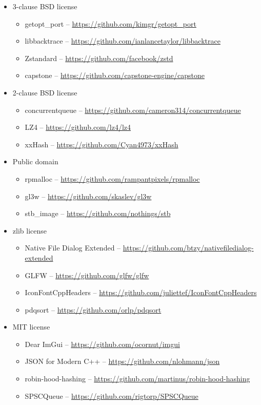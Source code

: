 \documentclass[hidelinks,titlepage,a4paper]{article}
\begin{document}
\begin{itemize}
\item 3-clause BSD license
\begin{itemize}
\item getopt\_port -- \url{https://github.com/kimgr/getopt\_port}
\item libbacktrace \faStar{} -- \url{https://github.com/ianlancetaylor/libbacktrace}
\item Zstandard -- \url{https://github.com/facebook/zstd}
\item capstone -- \url{https://github.com/capstone-engine/capstone}
\end{itemize}

\item 2-clause BSD license
\begin{itemize}
\item concurrentqueue \faStar{} -- \url{https://github.com/cameron314/concurrentqueue}
\item LZ4 \faStar{} -- \url{https://github.com/lz4/lz4}
\item xxHash -- \url{https://github.com/Cyan4973/xxHash}
\end{itemize}

\item Public domain
\begin{itemize}
\item rpmalloc \faStar{} -- \url{https://github.com/rampantpixels/rpmalloc}
\item gl3w -- \url{https://github.com/skaslev/gl3w}
\item stb\_image -- \url{https://github.com/nothings/stb}
\end{itemize}

\item zlib license
\begin{itemize}
\item Native File Dialog Extended -- \url{https://github.com/btzy/nativefiledialog-extended}
\item GLFW -- \url{https://github.com/glfw/glfw}
\item IconFontCppHeaders -- \url{https://github.com/juliettef/IconFontCppHeaders}
\item pdqsort -- \url{https://github.com/orlp/pdqsort}
\end{itemize}

\item MIT license
\begin{itemize}
\item Dear ImGui -- \url{https://github.com/ocornut/imgui}
\item JSON for Modern C++ -- \url{https://github.com/nlohmann/json}
\item robin-hood-hashing -- \url{https://github.com/martinus/robin-hood-hashing}
\item SPSCQueue \faStar{} -- \url{https://github.com/rigtorp/SPSCQueue}
\end{itemize}


\end{itemize}
\end{document}
